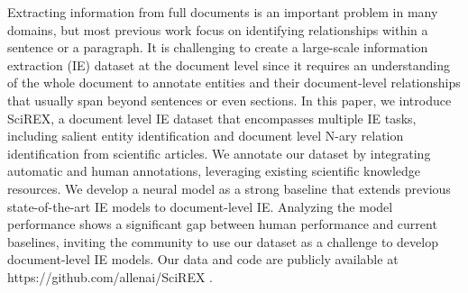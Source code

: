 Extracting information from full documents is an important problem in many domains, but most previous work focus on identifying relationships within a sentence or a paragraph. It is challenging to create a large-scale information extraction (IE) dataset at the document level since it requires an understanding of the whole document to annotate entities and their document-level relationships that usually span beyond sentences or even sections. In this paper, we introduce SciREX, a  document level IE dataset that encompasses multiple IE tasks, including salient entity identification and document level N-ary relation identification from scientific articles. We annotate our dataset by integrating automatic and human annotations, leveraging existing scientific knowledge resources. We develop a neural model as a strong baseline that extends previous state-of-the-art IE models to document-level IE. Analyzing the model performance shows a significant gap between human performance and current baselines, inviting the community to use our dataset as a challenge to develop document-level IE models.  Our data and code are  publicly available at https://github.com/allenai/SciREX .

